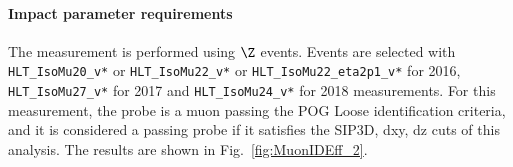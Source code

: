 \paragraph*{Impact parameter requirements}
The measurement is performed using $\Z$ events. Events are selected with \verb=HLT_IsoMu20_v*= or \verb=HLT_IsoMu22_v*= or \verb=HLT_IsoMu22_eta2p1_v*= for 2016, \verb=HLT_IsoMu27_v*= for 2017 and \verb=HLT_IsoMu24_v*= for 2018 measurements.
For this measurement, the probe is a muon passing the POG Loose identification criteria,
and it is considered a passing probe if it satisfies the SIP3D, dxy, dz cuts of this analysis.
%
The results are shown in Fig.~\ref{fig:MuonIDEff_2}.
